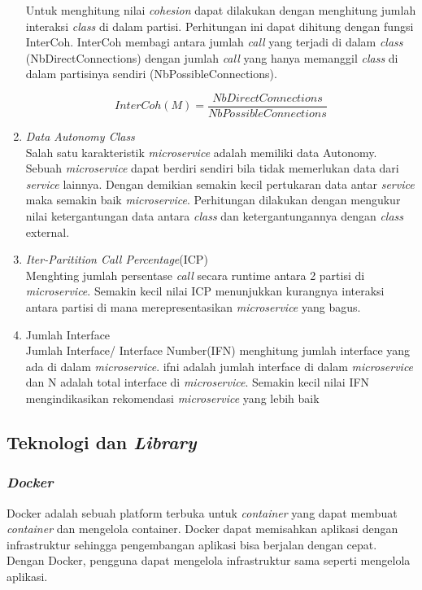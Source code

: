 \begin{enumerate}[leftmargin=1.3cm]
	Untuk menghitung nilai \textit{cohesion} dapat dilakukan dengan menghitung jumlah interaksi \textit{class} di dalam partisi. Perhitungan ini dapat dihitung dengan fungsi InterCoh. InterCoh membagi antara jumlah \textit{call} yang terjadi di dalam \textit{class} (NbDirectConnections) dengan jumlah \textit{call} yang hanya memanggil \textit{class} di dalam partisinya sendiri (NbPossibleConnections).
	
	\begin{equation}
		I n t e r C o h(M)=\frac{N b D i r e c t C o n n e c t i o n s}{N b P o s s i b l e C o n n e c t i o n s}
	\end{equation}
	
	\item \textit{Data Autonomy Class} \cite{5B1}\\
	Salah satu karakteristik \textit{microservice} adalah memiliki data Autonomy. Sebuah \textit{microservice} dapat berdiri sendiri bila tidak memerlukan data dari \textit{service} lainnya. Dengan demikian semakin kecil pertukaran data antar \textit{service} maka semakin baik \textit{microservice}. Perhitungan dilakukan dengan mengukur nilai ketergantungan data antara \textit{class} dan ketergantungannya dengan \textit{class} external.
	
	\item \textit{Iter-Paritition Call Percentage}(ICP) \cite{ECD} \\
	Menghting jumlah persentase \textit{call} secara runtime antara 2 partisi di \textit{microservice}. Semakin kecil nilai ICP menunjukkan kurangnya interaksi antara partisi di mana merepresentasikan \textit{microservice} yang bagus.	
	
	\item Jumlah Interface \cite{ECD} \\
	Jumlah Interface/ Interface Number(IFN) menghitung jumlah interface yang ada di dalam \textit{microservice}. ifni adalah jumlah interface di dalam \textit{microservice} dan N adalah total interface di \textit{microservice}. Semakin kecil nilai IFN mengindikasikan rekomendasi \textit{microservice} yang lebih baik\\


\end{enumerate}	

\subsection{Teknologi dan \textit{Library}}
\subsubsection{\textit{Docker} \cite{docker}}
Docker adalah sebuah platform terbuka untuk \textit{container} yang dapat membuat \textit{container} dan mengelola container. Docker dapat memisahkan aplikasi dengan infrastruktur sehingga pengembangan aplikasi bisa berjalan dengan cepat. Dengan Docker, pengguna dapat mengelola infrastruktur sama seperti mengelola aplikasi.

